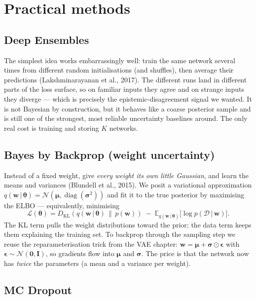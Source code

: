 \documentclass[11pt, oneside]{book}
\newcommand{\E}{\mathbb{E}}              %
\newcommand{\KL}[2]{D_{\mathrm{KL}}\!\left(#1 \,\|\, #2\right)}
\newcommand{\diag}{\operatorname{diag}}
\newcommand{\eye}{\mathbf{I}}
\newcommand{\zeros}{\mathbf{0}}
\newcommand{\loss}{\mathcal{L}}
\newcommand{\dataset}{\mathcal{D}}
\newcommand{\params}{\boldsymbol{\theta}}
\newcommand{\weights}{\mathbf{w}}
\newcommand{\Normal}{\mathcal{N}}
\newcommand{\given}{\,\vert\,}
\begin{document}
\section{Practical methods}

\subsection{Deep Ensembles}

The simplest idea works embarrassingly well: train the same network several times
from different random initialisations (and shuffles), then average their
predictions (Lakshminarayanan et al., 2017). The different runs land in different
parts of the loss surface, so on familiar inputs they agree and on strange inputs
they diverge --- which is precisely the epistemic-disagreement signal we wanted.
It is not Bayesian by construction, but it behaves like a coarse posterior sample
and is still one of the strongest, most reliable uncertainty baselines around. The
only real cost is training and storing $K$ networks.

\subsection{Bayes by Backprop (weight uncertainty)}

Instead of a fixed weight, give \emph{every weight its own little Gaussian}, and
learn the means and variances (Blundell et al., 2015). We posit a variational
approximation $q(\weights\given\params)=\Normal(\boldsymbol\mu,\diag(\boldsymbol\sigma^2))$
and fit it to the true posterior by maximising the ELBO --- equivalently,
minimising
\[
  \loss(\params)
  = \KL{q(\weights\given\params)}{p(\weights)}
    \;-\; \E_{q(\weights\given\params)}\bigl[\log p(\dataset\given\weights)\bigr].
\]
The KL term pulls the weight distributions toward the prior; the data term keeps
them explaining the training set. To backprop through the sampling step we reuse
the reparameterisation trick from the VAE chapter:
$\weights = \boldsymbol\mu + \boldsymbol\sigma\odot\boldsymbol\epsilon$ with
$\boldsymbol\epsilon\sim\Normal(\zeros,\eye)$, so gradients flow into
$\boldsymbol\mu$ and $\boldsymbol\sigma$. The price is that the network now has
\emph{twice} the parameters (a mean and a variance per weight).

\subsection{MC Dropout}
\end{document}
